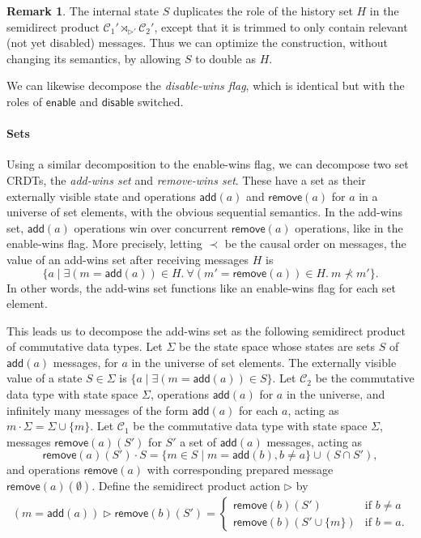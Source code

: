 \documentclass[acmsmall,nonacm,12pt]{acmart}
\newcommand{\mc}[1]{\ensuremath{\mathcal{#1}}}
\newcommand{\msf}[1]{\ensuremath{\mathsf{#1}}}
\newcommand{\act}{\triangleright}
\theoremstyle{plain}
\theoremstyle{definition}
\newtheorem{myrmk}[mythm]{Remark}
\begin{document}
\begin{myrmk}
The internal state $S$ duplicates the role of the history set $H$ in the semidirect product $\mc{C}_1' \rtimes_{\act'} \mc{C}_2'$, except that it is trimmed to only contain relevant (not yet disabled) messages.  Thus we can optimize the construction, without changing its semantics, by allowing $S$ to double as $H$.
\end{myrmk}

We can likewise decompose the \textit{disable-wins flag}, which is identical but with the roles of $\msf{enable}$ and $\msf{disable}$ switched.


\paragraph{Sets}
Using a similar decomposition to the enable-wins flag, we can decompose two set CRDTs, the \textit{add-wins set} and \textit{remove-wins set}.  These have a set as their externally visible state and operations $\msf{add}(a)$ and $\msf{remove}(a)$ for $a$ in a universe of set elements, with the obvious sequential semantics.  In the add-wins set, $\msf{add}(a)$ operations win over concurrent $\msf{remove}(a)$ operations, like in the enable-wins flag.  More precisely, letting $\prec$ be the causal order on messages, the value of an add-wins set after receiving messages $H$ is
\[
\{a \mid \exists (m = \msf{add}(a)) \in H.\ \forall (m' = \msf{remove}(a)) \in H.\ m \nprec m'\}.
\]
In other words, the add-wins set functions like an enable-wins flag for each set element.

This leads us to decompose the add-wins set as the following semidirect product of commutative data types.  Let $\Sigma$ be the state space whose states are sets $S$ of $\msf{add}(a)$ messages, for $a$ in the universe of set elements.  The externally visible value of a state $S \in \Sigma$ is $\{a \mid \exists (m = \msf{add}(a)) \in S\}$.  Let $\mc{C}_2$ be the commutative data type with state space $\Sigma$, operations $\msf{add}(a)$ for $a$ in the universe, and infinitely many messages of the form $\msf{add}(a)$ for each $a$, acting as $m \cdot \Sigma = \Sigma \cup \{m\}$.  Let $\mc{C}_1$ be the commutative data type with state space $\Sigma$, messages $\msf{remove}(a)(S')$ for $S'$ a set of $\msf{add}(a)$ messages, acting as
\[
\msf{remove}(a)(S') \cdot S = \{m \in S \mid m = \msf{add}(b), b \neq a\} \cup (S \cap S'),
\]
and operations $\msf{remove}(a)$ with corresponding prepared message $\msf{remove}(a)(\emptyset)$.  Define the semidirect product action $\act$ by
\begin{align*}
(m = \msf{add}(a)) \act \msf{remove}(b)(S') = \begin{cases} \msf{remove}(b)(S') &\mbox{if $b \neq a$} \\ \msf{remove}(b)(S' \cup \{m\}) &\mbox{if $b = a$}. \end{cases}
\end{align*}
\end{document}
